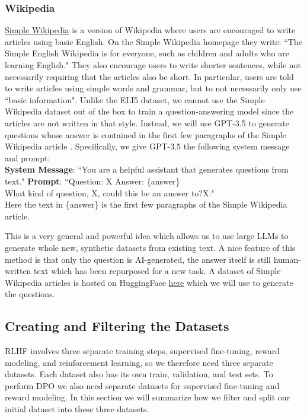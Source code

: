 \documentclass[11pt, oneside]{article}   	%
\begin{document}
\subsubsection*{Wikipedia}
\href{https://simple.wikipedia.org/wiki/Main_Page}{Simple Wikipedia} is a version of Wikipedia where users are encouraged to write articles using basic English.
On the Simple Wikipedia homepage they write: ``The Simple English Wikipedia is for everyone, such as children and adults who are learning English."
They also encourage users to write shorter sentences, while not necessarily requiring that the articles also be short.
In particular, users are told to write articles using simple words and grammar, but to not necessarily only use ``basic information".
Unlike the ELI5 dataset, we cannot use the Simple Wikipedia dataset out of the box to train a question-answering model since the articles are not written in that style.
Instead, we will use GPT-3.5 to generate questions whose answer is contained in the first few paragraphs of the Simple Wikipedia article \cite{koksal2023longform}. 
Specifically, we give GPT-3.5 the following system message and prompt:
\\[5pt]
\indent \textbf{System Message}: ``You are a helpful assistant that generates questions from text."
\indent \textbf{Prompt}: ``Question: X
\newline
\indent\indent\indent\indent Answer: \{answer\} 
\\
\indent\indent\indent\indent What kind of question, X, could this be an answer to?\newline \indent\indent\indent\indent X:"
\\[5pt]
Here the text in \{answer\} is the first few paragraphs of the Simple Wikipedia article.

This is a very general and powerful idea which allows us to use large LLMs to generate whole new, synthetic datasets from existing text.
A nice feature of this method is that only the question is AI-generated, the answer itself is still human-written text which has been repurposed for a new task.
A dataset of Simple Wikipedia articles is hosted on HuggingFace \href{https://huggingface.co/datasets/wikipedia/viewer/20220301.simple/train}{here} which we will use to generate the questions.

\subsection{Creating and Filtering the Datasets}
RLHF involves three separate training steps, supervised fine-tuning, reward modeling, and reinforcement learning, so we therefore need three separate datasets.
Each dataset also has its own train, validation, and test sets.
To perform DPO we also need separate datasets for supervised fine-tuning and reward modeling.
In this section we will summarize how we filter and split our initial dataset into these three datasets.
\end{document}
